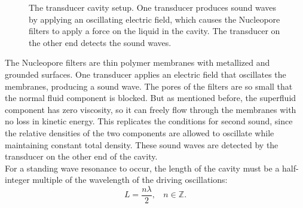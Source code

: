 \documentclass[prb,aps,twocolumn,showpacs,10pt]{revtex4-1}
\begin{document}
\begin{figure}
\caption{The transducer cavity setup. One transducer produces sound waves by applying an oscillating electric field, which causes the Nucleopore filters to apply a force on the liquid in the cavity. The transducer on the other end detects the sound waves. }
\end{figure}

The Nucleopore filters are thin polymer membranes with metallized and grounded surfaces. One transducer applies an electric field that oscillates the membranes, producing a sound wave. The pores of the filters are so small that the normal fluid component is blocked. But as mentioned before, the superfluid component has zero viscosity, so it can freely flow through the membranes with no loss in kinetic energy. This replicates the conditions for second sound, since the relative densities of the two components are allowed to oscillate while maintaining constant total density. These sound waves are detected by the transducer on the other end of the cavity.\\

For a standing wave resonance to occur, the length of the cavity must be a half-integer multiple of the wavelength of the driving oscillations\cite{phy}:
\begin{equation}
L=\frac{n \lambda}{2}, \ \ \ \ n \in \mathbb{Z}.
\end{equation}
\end{document}
